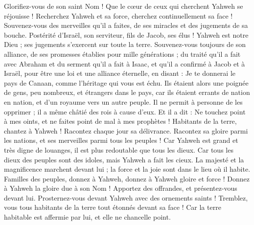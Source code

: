 \begin{multicols}{2}
Glorifiez-vous de son saint Nom !  Que le cœur de ceux qui cherchent Yahweh se réjouisse !
Recherchez Yahweh et sa force, cherchez continuellement sa face !
Souvenez-vous des merveilles qu'il a faites, de ses miracles et des jugements de sa bouche.
Postérité d'Israël, son serviteur, fils de Jacob, ses élus !
Yahweh est notre Dieu ; ses jugements s’exercent sur toute la terre.
Souvenez-vous toujours de son alliance, de ses promesses établies pour mille générations ;
du traité qu'il a fait avec Abraham et du serment qu’il a fait à Isaac,
et qu’il a confirmé à Jacob et à Israël, pour être une loi et une alliance éternelle,
en disant : Je te donnerai le pays de Canaan, comme l’héritage qui vous est échu.
Ils étaient alors une  poignée de gens, peu nombreux, et étrangers dans le pays,
car ils étaient errants de nation en nation, et d'un royaume vers un autre peuple.
Il ne permit à personne de les opprimer ; il a même châtié des rois à cause d'eux.
Et il a dit : Ne touchez point à mes oints, et ne faites point de mal à mes prophètes !
Habitants de la terre, chantez à Yahweh ! Racontez chaque jour sa délivrance.
Racontez sa gloire parmi les nations, et ses merveilles parmi tous les peuples !
Car Yahweh est grand et très digne de louanges, il est plus redoutable que tous les dieux.
Car tous les dieux des peuples sont des idoles, mais Yahweh a fait les cieux.
La majesté et la magnificence marchent devant lui ; la force et la joie sont dans le lieu où il habite.
Familles des peuples, donnez à Yahweh, donnez à Yahweh gloire et force !
Donnez à Yahweh la gloire due à son Nom ! Apportez des offrandes, et présentez-vous devant lui. Prosternez-vous devant Yahweh avec des ornements saints !
Tremblez, vous tous habitants de la terre tout étonnés devant sa face ! Car la terre habitable est affermie par lui, et elle ne chancelle point.

\end{multicols}
